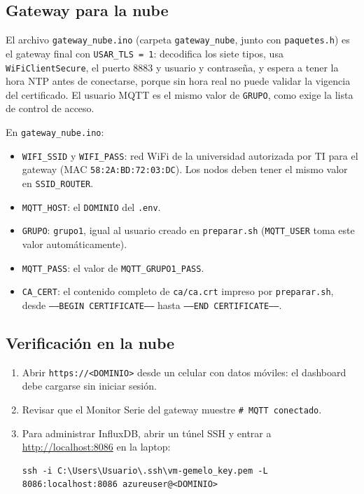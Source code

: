 \documentclass[11pt,a4paper]{article}
\newcommand{\arch}[1]{\texttt{#1}}
\begin{document}
\subsection{Gateway para la nube}

El archivo \arch{gateway\_nube.ino} (carpeta \arch{gateway\_nube}, junto con
\arch{paquetes.h}) es el gateway final con \texttt{USAR\_TLS = 1}: decodifica los siete tipos,
usa \texttt{WiFiClientSecure}, el puerto 8883 y usuario y contrase\~na, y espera a tener la hora
NTP antes de conectarse, porque sin hora real no puede validar la vigencia del certificado. El
usuario MQTT es el mismo valor de \texttt{GRUPO}, como exige la lista de control de acceso.

\begin{completar}
En \arch{gateway\_nube.ino}:
\begin{itemize}
  \item \texttt{WIFI\_SSID} y \texttt{WIFI\_PASS}: red WiFi de la universidad autorizada por TI
        para el gateway (MAC \texttt{58:2A:BD:72:03:DC}). Los nodos deben tener el mismo valor
        en \texttt{SSID\_ROUTER}.
  \item \texttt{MQTT\_HOST}: el \texttt{DOMINIO} del \arch{.env}.
  \item \texttt{GRUPO}: \texttt{grupo1}, igual al usuario creado en \arch{preparar.sh}
        (\texttt{MQTT\_USER} toma este valor autom\'aticamente).
  \item \texttt{MQTT\_PASS}: el valor de \texttt{MQTT\_GRUPO1\_PASS}.
  \item \texttt{CA\_CERT}: el contenido completo de \arch{ca/ca.crt} impreso por
        \arch{preparar.sh}, desde \texttt{-----BEGIN CERTIFICATE-----} hasta
        \texttt{-----END CERTIFICATE-----}.
\end{itemize}
\end{completar}

\subsection{Verificaci\'on en la nube}

\begin{enumerate}
  \item Abrir \texttt{https://<DOMINIO>} desde un celular con datos m\'oviles: el dashboard
        debe cargarse sin iniciar sesi\'on.
  \item Revisar que el Monitor Serie del gateway muestre \texttt{\# MQTT conectado}.
  \item Para administrar InfluxDB, abrir un t\'unel SSH y entrar a
        \url{http://localhost:8086} en la laptop:
\begin{lstlisting}[style=bash]
ssh -i C:\Users\Usuario\.ssh\vm-gemelo_key.pem -L 8086:localhost:8086 azureuser@<DOMINIO>
\end{lstlisting}
\end{enumerate}
\end{document}
